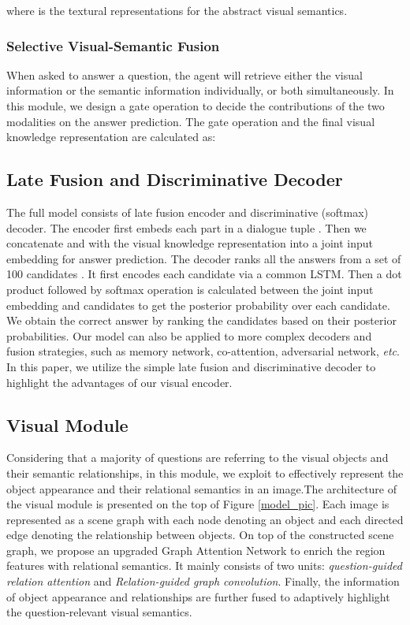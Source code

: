 \documentclass[letterpaper]{article} \usepackage{aaai20}  \usepackage{times}  \usepackage{helvet} \usepackage{courier}  \usepackage[hyphens]{url}  \usepackage{graphicx} \urlstyle{rm} \def\UrlFont{\rm}  \usepackage{graphicx}  \frenchspacing  \setlength{\pdfpagewidth}{8.5in}  \setlength{\pdfpageheight}{11in}  \usepackage{mathrsfs} \usepackage{amsfonts,amssymb}  \usepackage{tabularx} \usepackage{url}
\begin{document}
where  is the textural representations for the abstract visual semantics.


\subsubsection{Selective Visual-Semantic Fusion}

When asked to answer a question, the agent will retrieve either the visual information or the semantic information individually, or both simultaneously.
In this module, we design a gate operation to decide the contributions of the two modalities on the answer prediction. The gate operation and the final visual knowledge representation  are calculated as:



\subsection{Late Fusion and Discriminative Decoder}
\label{LateFusion}
The full model consists of late fusion encoder and discriminative (softmax) decoder. The encoder first embeds each part in a dialogue tuple . Then we concatenate   and  with the visual knowledge representation  into a joint input embedding for answer prediction. 
The decoder ranks all the answers from a set of 100 candidates . It first encodes each candidate via a common LSTM. Then a dot product followed by softmax operation is calculated between the joint input embedding and candidates to get the posterior probability over each candidate. We obtain the correct answer by ranking the candidates based on their posterior probabilities. Our model can also be applied to more complex decoders and fusion strategies, such as memory network, co-attention, adversarial network, \emph{etc}. In this paper, we utilize the simple late fusion and  discriminative decoder to highlight the advantages of our visual encoder.




\iffalse
\subsection{Visual Module}
\label{VisualModule}

Considering that a majority of questions are referring to the visual objects and their semantic relationships, in this module, we exploit to effectively represent the object appearance and their relational semantics in an image.The architecture of the visual module is presented on the top of  Figure \ref{model_pic}. Each image is represented as a scene graph with each node denoting an object and each directed edge denoting the relationship between objects. On top of the constructed scene graph, we propose an upgraded Graph Attention Network to enrich the region features with relational semantics. It mainly consists of two units: \textit{question-guided relation attention} and \textit{Relation-guided graph convolution}. Finally, the information of object appearance and relationships are further fused to adaptively highlight the question-relevant visual semantics. 
\end{document}
